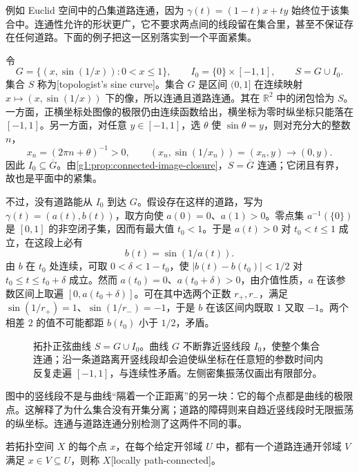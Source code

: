 例如 Euclid 空间中的凸集道路连通，因为 \(\gamma(t)=(1-t)x+ty\) 始终位于该集合中。连通性允许的形状更广，它不要求两点间的线段留在集合里，甚至不保证存在任何道路。下面的例子把这一区别落实到一个平面紧集。

\begin{example}[拓扑正弦曲线]\label{g1:exm:topologist-sine}
	令
	\[
		G=\{(x,\sin(1/x)):0<x\le1\},\qquad I_0=\{0\}\times[-1,1],\qquad S=G\cup I_0.
	\]
	集合 \(S\) 称为[topologist's sine curve]。集合 \(G\) 是区间 \((0,1]\) 在连续映射 \(x\mapsto(x,\sin(1/x))\) 下的像，所以连通且道路连通。其在 \(\mathbb R^2\) 中的闭包恰为 \(S\)。一方面，正横坐标处图像的极限仍由连续函数给出，横坐标为零时纵坐标只能落在 \([-1,1]\)。另一方面，对任意 \(y\in[-1,1]\)，选 \(\theta\) 使 \(\sin\theta=y\)，则对充分大的整数 \(n\)，
	\[
		x_n=(2\pi n+\theta)^{-1}>0,\qquad (x_n,\sin(1/x_n))=(x_n,y)\longrightarrow(0,y).
	\]
	因此 \(I_0\subseteq\overline G\)。由\cref{g1:prop:connected-image-closure}，\(S=\overline G\) 连通；它闭且有界，故也是平面中的紧集。

	不过，没有道路能从 \(I_0\) 到达 \(G\)。假设存在这样的道路，写为 \(\gamma(t)=(a(t),b(t))\)，取方向使 \(a(0)=0\)、\(a(1)>0\)。零点集 \(a^{-1}(\{0\})\) 是 \([0,1]\) 的非空闭子集，因而有最大值 \(t_0<1\)。于是 \(a(t)>0\) 对 \(t_0<t\le1\) 成立，在这段上必有
	\[
		b(t)=\sin(1/a(t)).
	\]
	由 \(b\) 在 \(t_0\) 处连续，可取 \(0<\delta<1-t_0\)，使 \(|b(t)-b(t_0)|<1/2\) 对 \(t_0\le t\le t_0+\delta\) 成立。然而 \(a(t_0)=0\)、\(a(t_0+\delta)>0\)，由介值性质，\(a\) 在该参数区间上取遍 \([0,a(t_0+\delta)]\)。可在其中选两个正数 \(r_+,r_-\)，满足 \(\sin(1/r_+)=1\)、\(\sin(1/r_-)=-1\)，于是 \(b\) 在该区间内既取 \(1\) 又取 \(-1\)。两个相差 \(2\) 的值不可能都距 \(b(t_0)\) 小于 \(1/2\)，矛盾。
\end{example}

\begin{figure}[htbp]
	\centering
	
	\caption[拓扑正弦曲线]{拓扑正弦曲线 \(S=G\cup I_0\)。曲线 \(G\) 不断靠近竖线段 \(I_0\)，使整个集合连通；沿一条道路离开竖线段却会迫使纵坐标在任意短的参数时间内反复走遍 \([-1,1]\)，与连续性矛盾。左侧密集振荡仅画出有限部分。}
	\label{g1:fig:topologist-sine}
\end{figure}

图中的竖线段不是与曲线“隔着一个正距离”的另一块：它的每个点都是曲线的极限点。这解释了为什么集合没有开集分离；道路的障碍则来自趋近竖线段时无限振荡的纵坐标。连通与道路连通分别检测了这两件不同的事。

\begin{definition}\label{g1:def:locally-path-connected}
	若拓扑空间 \(X\) 的每个点 \(x\)，在每个给定开邻域 \(U\) 中，都有一个道路连通开邻域 \(V\) 满足 \(x\in V\subseteq U\)，则称 \(X\)[locally path-connected]。
\end{definition}

